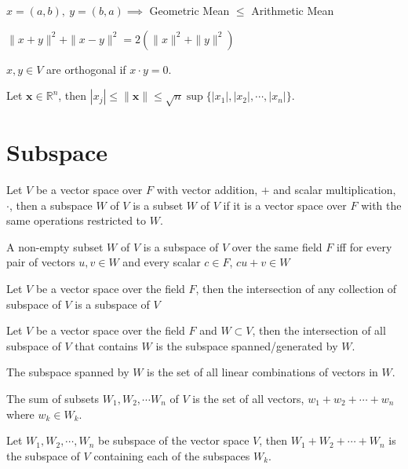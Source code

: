 	\begin{remark}
		$x = (a,b),\ y = (b,a) \implies $ Geometric Mean $\le$ Arithmetic Mean
	\end{remark}
	\begin{remark}
		$\|x+y\|^2 + \|x-y\|^2 = 2(\|x\|^2 + \|y\|^2)$
	\end{remark}
	\begin{remark}[orthogonal]
		$x,y \in V$ are orthogonal if $x \cdot y = 0$.
	\end{remark}
	\begin{theorem}
		Let $\textbf{x} \in \mathbb{R}^n$, then $|x_j| \le \|\textbf{x}\| \le \sqrt{n} \sup \{ |x_1|, |x_2|, \cdots, |x_n| \}$.
	\end{theorem}
\section{Subspace}
	\begin{definition}
		Let $V$ be a vector space over $F$ with vector addition, $+$ and scalar multiplication, $\cdot$, then a subspace $W$ of $V$ is a subset $W$ of $V$ if it is a vector space over $F$ with the same operations restricted to $W$.
	\end{definition}
	\begin{theorem}
		A non-empty subset $W$ of $V$ is a subspace of $V$ over the same field $F$ iff for every pair of vectors $u,v \in W$ and every scalar $c \in F$, $cu+v \in W$
	\end{theorem}
	\begin{theorem}
		Let $V$ be a vector space over the field $F$, then the intersection of any collection of subspace of $V$ is a subspace of $V$
	\end{theorem}
	\begin{theorem}
		Let $V$ be a vector space over the field $F$ and $W \subset V$, then the intersection of all subspace of $V$ that contains $W$ is the subspace spanned/generated by $W$.
	\end{theorem}	
	\begin{theorem}
		The subspace spanned by $W$ is the set of all linear combinations of vectors in $W$.
	\end{theorem}
	\begin{definition}
		The sum of subsets $W_1, W_2, \cdots W_n$ of $V$ is the set of all vectors, $w_1 + w_2 + \cdots + w_n$ where $w_k \in W_k$.
	\end{definition}
	\begin{theorem}
		Let $W_1, W_2, \cdots, W_n$ be subspace of the vector space $V$, then $W_1+W_2+\cdots+W_n$ is the subspace of $V$ containing each of the subspaces $W_k$.
	\end{theorem}
